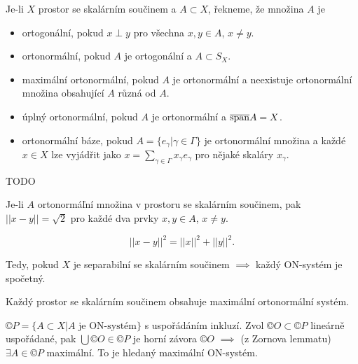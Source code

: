 \documentclass[12pt]{article}					%
\begin{document}
\begin{definice}
	Je-li $X$ prostor se skalárním součinem a $A \subset X$, řekneme, že množina $A$ je

	\begin{itemize}
		\item ortogonální, pokud $x \perp y$ pro všechna $x, y \in A$, $x ≠ y$.
		\item ortonormální, pokud $A$ je ortogonální a $A \subset S_X$.
		\item maximální ortonormální, pokud $A$ je ortonormální a neexistuje ortonormální množina obsahující $A$ různá od $A$.
		\item úplný ortonormální, pokud $A$ je ortonormální a $\overline{\operatorname{span}} A = X$.
		\item ortonormální báze, pokud $A = \{e_\gamma | \gamma \in \Gamma\}$ je ortonormální množina a každé $x \in X$ lze vyjádřit jako $x = \sum_{\gamma \in \Gamma}x_\gamma e_\gamma$ pro nějaké skaláry $x_\gamma$.
	\end{itemize}
	TODO
\end{definice}

\begin{tvrzeni}[Fakt]
	Je-li $A$ ortonormáľní množina v prostoru se skalárním součinem, pak $||x - y|| = \sqrt{2}$ pro každé dva prvky $x, y \in A$, $x ≠ y$.

	\begin{dukazin}
		$$ ||x - y||^2 = ||x||^2 + ||y||^2. $$
	\end{dukazin}

	\begin{poznamkain}
		Tedy, pokud $X$ je separabilní se skalárním součinem $\implies$ každý ON-systém je spočetný.
	\end{poznamkain}
\end{tvrzeni}

\begin{veta}
	Každý prostor se skalárním součinem obsahuje maximální ortonormální systém.

	\begin{dukazin}
		$©P = \{A \subset X | A \text{ je ON-systém}\}$ s uspořádáním inkluzí. Zvol $©O \subset ©P$ lineárně uspořádané, pak $\bigcup ©O \in ©P$ je horní závora $©O$ $\implies$ (z Zornova lemmatu) $\exists A \in ©P$ maximální. To je hledaný maximální ON-systém.
	\end{dukazin}
\end{veta}
\end{document}
